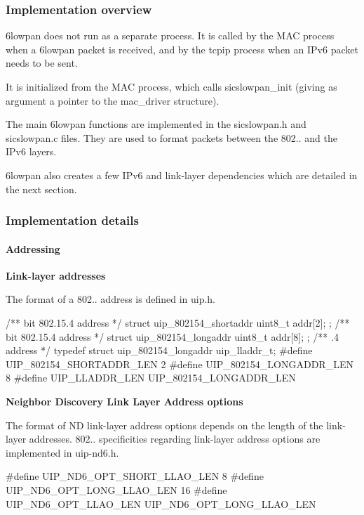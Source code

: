 \hypertarget{a00056_general}{}\subsubsection{\-Implementation overview}\label{a00056_general}
6lowpan does not run as a separate process. \-It is called by the \-M\-A\-C process when a 6lowpan packet is received, and by the tcpip process when an \-I\-Pv6 packet needs to be sent.

\-It is initialized from the \-M\-A\-C process, which calls sicslowpan\-\_\-init (giving as argument a pointer to the mac\-\_\-driver structure).

\-The main 6lowpan functions are implemented in the sicslowpan.\-h and sicslowpan.\-c files. \-They are used to format packets between the 802.. and the \-I\-Pv6 layers.

6lowpan also creates a few \-I\-Pv6 and link-\/layer dependencies which are detailed in the next section.



\hypertarget{a00056_implementation}{}\subsubsection{\-Implementation details}\label{a00056_implementation}
\hypertarget{a00056_Addressing}{}\paragraph{\-Addressing}\label{a00056_Addressing}
{\bfseries \-Link-\/layer addresses}\par
 \-The format of a 802.. address is defined in uip.\-h. 
\begin{DoxyCode}
/**  bit 802.15.4 address */
struct uip_802154_shortaddr {
  uint8_t addr[2];
};
/**  bit 802.15.4 address */
struct uip_802154_longaddr {
  uint8_t addr[8];
};
/** .4 address */
typedef struct uip_802154_longaddr uip_lladdr_t;
#define UIP_802154_SHORTADDR_LEN 2
#define UIP_802154_LONGADDR_LEN  8
#define UIP_LLADDR_LEN UIP_802154_LONGADDR_LEN
\end{DoxyCode}


{\bfseries \-Neighbor \-Discovery \-Link \-Layer \-Address options }\par
 \-The format of \-N\-D link-\/layer address options depends on the length of the link-\/layer addresses. 802.. specificities regarding link-\/layer address options are implemented in uip-\/nd6.\-h. 
\begin{DoxyCode}
#define UIP_ND6_OPT_SHORT_LLAO_LEN     8
#define UIP_ND6_OPT_LONG_LLAO_LEN      16
#define UIP_ND6_OPT_LLAO_LEN UIP_ND6_OPT_LONG_LLAO_LEN 
\end{DoxyCode}


